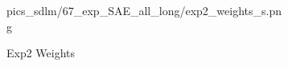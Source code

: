 \begin{figure}
\begin{subfigure}[c]{0.48\textwidth}
{			{pics_sdlm/67_exp_SAE_all_long/exp2_weights_s.png}}
		\caption{Exp2 Weights}
	\end{subfigure}%
	\hspace{1em}
	\begin{subfigure}[c]{0.48\textwidth}\raggedleft
		\\
		\\
\end{subfigure}
\end{figure}
